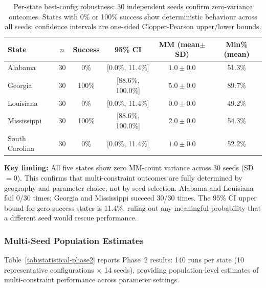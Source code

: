 \begin{table}[t]
\centering
\caption{Per-state best-config robustness: 30 independent seeds confirm zero-variance outcomes. States with 0\% or 100\% success show deterministic behaviour across all seeds; confidence intervals are one-sided Clopper-Pearson upper/lower bounds.}
\label{tab:statistical-perstate}
\small
\begin{tabular}{lccccc}
\toprule
\textbf{State} & \textbf{$n$} & \textbf{Success} & \textbf{95\% CI} & \textbf{MM (mean$\pm$SD)} & \textbf{Min\% (mean)} \\
\midrule
Alabama        & 30 & 0\%   & [0.0\%, 11.4\%]   & $1.0 \pm 0.0$ & 51.3\% \\
Georgia        & 30 & 100\% & [88.6\%, 100.0\%] & $5.0 \pm 0.0$ & 89.7\% \\
Louisiana      & 30 & 0\%   & [0.0\%, 11.4\%]   & $0.0 \pm 0.0$ & 49.2\% \\
Mississippi    & 30 & 100\% & [88.6\%, 100.0\%] & $2.0 \pm 0.0$ & 54.3\% \\
South Carolina & 30 & 0\%   & [0.0\%, 11.4\%]   & $1.0 \pm 0.0$ & 52.2\% \\
\bottomrule
\end{tabular}
\end{table}

\textbf{Key finding:} All five states show zero MM-count variance across 30 seeds (SD~$= 0$). This confirms that multi-constraint outcomes are fully determined by geography and parameter choice, not by seed selection. Alabama and Louisiana fail 0/30 times; Georgia and Mississippi succeed 30/30 times. The 95\% CI upper bound for zero-success states is 11.4\%, ruling out any meaningful probability that a different seed would rescue performance.

\subsubsection{Multi-Seed Population Estimates}

Table~\ref{tab:statistical-phase2} reports Phase~2 results: 140 runs per state (10 representative configurations $\times$ 14 seeds), providing population-level estimates of multi-constraint performance across parameter settings.

